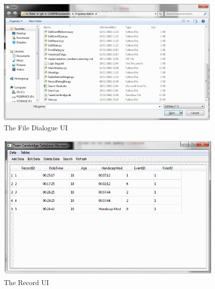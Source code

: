 \begin{figure}
\includegraphics[width=\textwidth]{./Maintenance/UI/FileDia.png}
\caption{The File Dialogue UI} \label{fig:FileDia_UI}
\end{figure}

\begin{figure}
\includegraphics[width=\textwidth]{./Maintenance/UI/Record.png}
\caption{The Record UI} \label{fig:Record_UI}
\end{figure}

